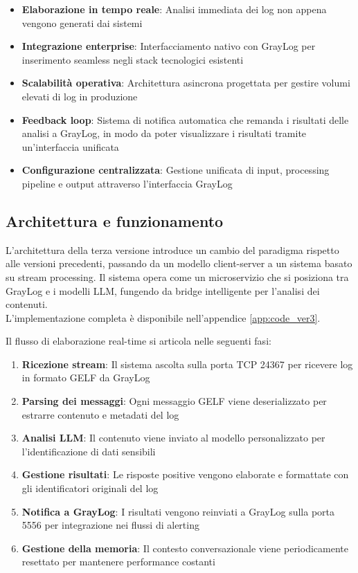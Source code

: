 \documentclass[12pt]{report}
\begin{document}
\begin{itemize}
    \item \textbf{Elaborazione in tempo reale}: Analisi immediata dei log non appena vengono generati dai sistemi
    \item \textbf{Integrazione enterprise}: Interfacciamento nativo con GrayLog per inserimento seamless negli stack tecnologici esistenti
    \item \textbf{Scalabilità operativa}: Architettura asincrona progettata per gestire volumi elevati di log in produzione
    \item \textbf{Feedback loop}: Sistema di notifica automatica che remanda i risultati delle analisi a GrayLog, in modo da poter visualizzare i risultati tramite un'interfaccia unificata
    \item \textbf{Configurazione centralizzata}: Gestione unificata di input, processing pipeline e output attraverso l'interfaccia GrayLog
\end{itemize}

\subsection{Architettura e funzionamento}
\label{subsec:ver3_architettura}

L'architettura della terza versione introduce un cambio del paradigma rispetto alle versioni precedenti, passando da un modello client-server a un sistema basato su stream processing. Il sistema opera come un microservizio che si posiziona tra GrayLog e i modelli LLM, fungendo da bridge intelligente per l'analisi dei contenuti. \\
L'implementazione completa è disponibile nell'appendice \ref{app:code_ver3}.

Il flusso di elaborazione real-time si articola nelle seguenti fasi:

\begin{enumerate}
    \item \textbf{Ricezione stream}: Il sistema ascolta sulla porta TCP 24367 per ricevere log in formato GELF da GrayLog
    \item \textbf{Parsing dei messaggi}: Ogni messaggio GELF viene deserializzato per estrarre contenuto e metadati del log
    \item \textbf{Analisi LLM}: Il contenuto viene inviato al modello personalizzato per l'identificazione di dati sensibili
    \item \textbf{Gestione risultati}: Le risposte positive vengono elaborate e formattate con gli identificatori originali del log
    \item \textbf{Notifica a GrayLog}: I risultati vengono reinviati a GrayLog sulla porta 5556 per integrazione nei flussi di alerting
    \item \textbf{Gestione della memoria}: Il contesto conversazionale viene periodicamente resettato per mantenere performance costanti
\end{enumerate}
\end{document}
